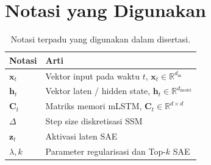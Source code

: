 \section{Notasi yang Digunakan}
\label{subsec:bab3_notasi}

\begin{table}[ht]
\centering
\caption{Notasi terpadu yang digunakan dalam disertasi.}
\label{tab:bab3_notasi}
\small
\begin{tabular}{@{}p{2.5cm}p{11cm}@{}}
\toprule
Notasi & Arti \\
\midrule
$\mathbf{x}_t$ & Vektor input pada waktu $t$, $\mathbf{x}_t \in \mathbb{R}^{d_{\text{in}}}$ \\
$\mathbf{h}_t$ & Vektor laten / hidden state, $\mathbf{h}_t \in \mathbb{R}^{d_{\text{model}}}$ \\
$\mathbf{C}_t$ & Matriks memori mLSTM, $\mathbf{C}_t \in \mathbb{R}^{d \times d}$ \\
$\Delta$       & Step size diskretisasi SSM \\
$\mathbf{z}_t$ & Aktivasi laten SAE \\
$\lambda, k$   & Parameter regularisasi dan Top-$k$ SAE \\
\bottomrule
\end{tabular}
\end{table}
